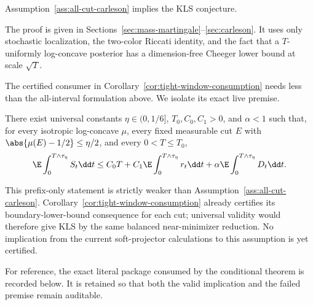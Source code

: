 \documentclass[../../main.tex]{subfiles}
\begin{document}
\begin{theorem}
\label{thm:intro-all-cut}
Assumption~\ref{ass:all-cut-carleson} implies the KLS conjecture.
\end{theorem}

The proof is given in Sections~\ref{sec:mass-martingale}--\ref{sec:carleson}. It uses only
stochastic localization, the two-color Riccati identity, and the fact that a $T$-uniformly
log-concave posterior has a dimension-free Cheeger lower bound at scale $\sqrt T$.

The certified consumer in Corollary~\ref{cor:tight-window-consumption} needs less than the
all-interval formulation above. We isolate its exact live premise.

\begin{assumption}
\label{ass:tight-prefix-carleson}
There exist universal constants $\eta\in(0,1/6]$, $T_0,C_0,C_1>0$, and $\alpha<1$ such that,
for every isotropic log-concave $\mu$, every fixed measurable cut $E$ with
$\abs{\mu(E)-1/2}\le\eta/2$, and every $0<T\le T_0$,
\begin{equation}\label{eq:tight-prefix-carleson}
  \E\int_0^{T\wedge\tau_\eta} S_t\dd t
  \le C_0T+C_1\E\int_0^{T\wedge\tau_\eta}r_t\dd t
  +\alpha\E\int_0^{T\wedge\tau_\eta}D_t\dd t .
\end{equation}
\end{assumption}

This prefix-only statement is strictly weaker than
Assumption~\ref{ass:all-cut-carleson}. Corollary~\ref{cor:tight-window-consumption} already
certifies its boundary-lower-bound consequence for each cut; universal validity would therefore
give KLS by the same balanced near-minimizer reduction. No implication from the current
soft-projector calculations to this assumption is yet certified.

For reference, the exact literal package consumed by the conditional theorem is recorded below.
It is retained so that both the valid implication and the failed premise remain auditable.
\end{document}
